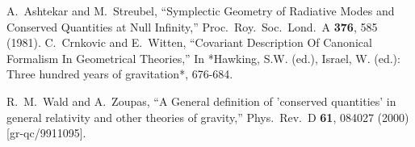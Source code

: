 \documentclass[12pt]{article}
\numberwithin{equation}{section}
\begin{document}
\begin{thebibliography}{99}
  A.~Ashtekar and M.~Streubel,
  ``Symplectic Geometry of Radiative Modes and Conserved Quantities at Null Infinity,''
  Proc.\ Roy.\ Soc.\ Lond.\ A {\bf 376}, 585 (1981).
  C.~Crnkovic and E.~Witten,
  ``Covariant Description Of Canonical Formalism In Geometrical Theories,''
  In *Hawking, S.W. (ed.), Israel, W. (ed.): Three hundred years of gravitation*, 676-684.
  

  R.~M.~Wald and A.~Zoupas,
  ``A General definition of 'conserved quantities' in general relativity and other theories of gravity,''
  Phys.\ Rev.\ D {\bf 61}, 084027 (2000)
  [gr-qc/9911095].
  

\end{thebibliography}
\end{document}
